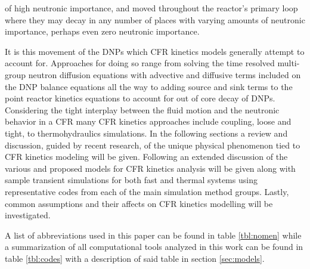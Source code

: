 \documentclass[review]{elsarticle}
\begin{document}
of high neutronic importance, and moved throughout the reactor's primary loop
where they may decay in any number of places with varying amounts of
neutronic importance, perhaps even zero neutronic importance. 
\par It is this movement of the DNPs which CFR kinetics models generally
attempt to account for. Approaches for doing so range from solving the 
time resolved multi-group neutron diffusion equations with advective and
diffusive terms included on the DNP balance equations all the way to adding
source and sink terms to the point reactor kinetics equations to account
for out of core decay of DNPs. Considering the tight interplay between the
fluid motion and the neutronic behavior in a CFR many CFR kinetics approaches
include coupling, loose and tight, to thermohydraulics simulations. In the
following sections a review and discussion, guided by recent research, of the
unique physical phenomenon tied to CFR kinetics modeling will be given. 
Following an extended discussion of the various and proposed models for CFR
kinetics analysis will be given along with sample transient simulations for
both fast and thermal systems using representative codes from each of the main
simulation method groups. Lastly, common assumptions and their affects on CFR
kinetics modelling will be investigated.
\par A list of abbreviations used in this paper can be found in table
\ref{tbl:nomen} while a summarization of all computational tools analyzed
in this work can be found in table \ref{tbl:codes} with a description of said
table in section \ref{sec:models}.
\end{document}
